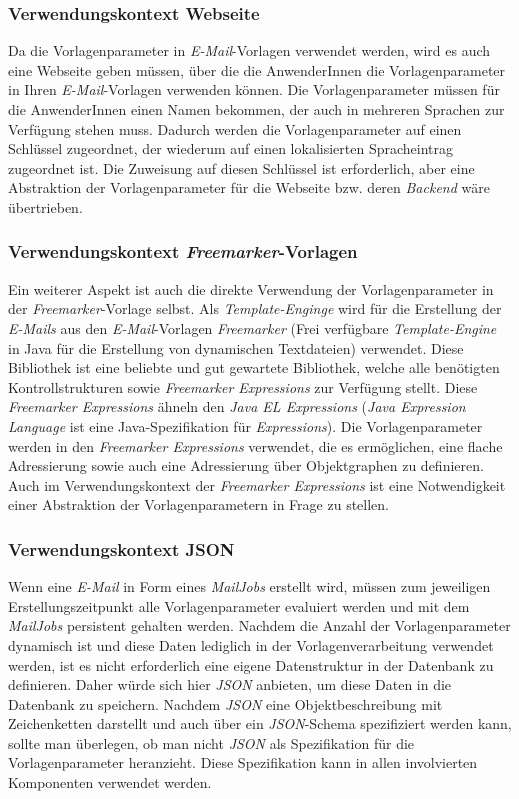\subsubsection{Verwendungskontext Webseite}
\label{sec:template-parameter-web-view}
Da die Vorlagenparameter in \emph{E-Mail}-Vorlagen verwendet werden, wird es auch eine Webseite geben müssen, über die die AnwenderInnen die Vorlagenparameter in Ihren \emph{E-Mail}-Vorlagen verwenden können. Die Vorlagenparameter müssen für die AnwenderInnen einen Namen bekommen, der auch in mehreren Sprachen zur Verfügung stehen muss. Dadurch werden die Vorlagenparameter auf einen Schlüssel zugeordnet, der wiederum auf einen lokalisierten Spracheintrag zugeordnet ist. Die Zuweisung auf diesen Schlüssel ist erforderlich, aber eine Abstraktion der Vorlagenparameter für die Webseite bzw. deren \emph{Backend} wäre übertrieben.

\subsubsection{Verwendungskontext \emph{Freemarker}-Vorlagen}
\label{sec:template-parameter-freemarker}
Ein weiterer Aspekt ist auch die direkte Verwendung der Vorlagenparameter in der \emph{Freemarker}-Vorlage selbst. Als \emph{Template-Enginge} wird für die Erstellung der \emph{E-Mails} aus den \emph{E-Mail}-Vorlagen \emph{Freemarker} (Frei verfügbare \emph{Template-Engine} in Java für die Erstellung von dynamischen Textdateien) verwendet. Diese Bibliothek ist eine beliebte und gut gewartete Bibliothek, welche alle benötigten Kontrollstrukturen sowie \emph{Freemarker Expressions} zur Verfügung stellt. Diese \emph{Freemarker Expressions} ähneln den \emph{Java EL Expressions} (\emph{Java Expression Language} ist eine Java-Spezifikation für \emph{Expressions}). Die Vorlagenparameter werden in den \emph{Freemarker Expressions} verwendet, die es ermöglichen, eine flache Adressierung sowie auch eine Adressierung über Objektgraphen zu definieren. Auch im Verwendungskontext der \emph{Freemarker Expressions} ist eine Notwendigkeit einer Abstraktion der Vorlagenparametern in Frage zu stellen.

\subsubsection{Verwendungskontext JSON}
\label{sec:template-parameter-json}
Wenn eine \emph{E-Mail} in Form eines \emph{MailJobs} erstellt wird, müssen zum jeweiligen Erstellungszeitpunkt alle Vorlagenparameter evaluiert werden und mit dem \emph{MailJobs} persistent gehalten werden. Nachdem die Anzahl der Vorlagenparameter dynamisch ist und diese Daten lediglich in der Vorlagenverarbeitung verwendet werden, ist es nicht erforderlich eine eigene Datenstruktur in der Datenbank zu definieren. Daher würde sich hier \emph{JSON} anbieten, um diese Daten in die Datenbank zu speichern. Nachdem \emph{JSON} eine Objektbeschreibung mit Zeichenketten darstellt und auch über ein \emph{JSON}-Schema spezifiziert werden kann, sollte man überlegen, ob man nicht \emph{JSON} als Spezifikation für die Vorlagenparameter heranzieht. Diese Spezifikation kann in allen involvierten Komponenten verwendet werden. 

